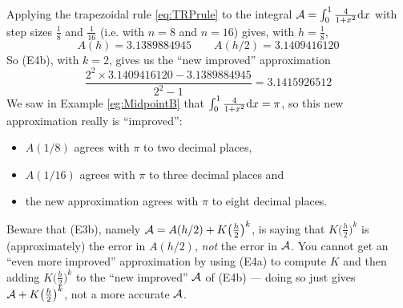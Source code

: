 \begin{eg}\label{eg:Richard}
Applying the trapezoidal rule \eqref{eq:TRPrule}
to the integral $\mathcal{A}=\int_0^1\frac{4}{1+x^2}\mathrm{d}x$
with step sizes $\frac{1}{8}$ and $\frac{1}{16}$
(i.e. with $n=8$ and $n=16$) gives, with $h=\frac{1}{8}$,
\begin{equation*}
A(h)=3.1389884945\qquad
A(h/2)=3.1409416120
\end{equation*}
So (E4b), with $k=2$, gives us
the ``new improved'' approximation
\begin{equation*}
\frac{2^2\times 3.1409416120 -3.1389884945}{2^2-1}=3.1415926512
\end{equation*}
We saw in Example \ref{eg:MidpointB} that $\int_0^1\frac{4}{1+x^2}\mathrm{d}x=\pi$,
so this new approximation really is ``improved'':
\begin{itemize}\itemsep1pt \parskip0pt  %
\item $A(1/8)$ agrees with $\pi$ to two decimal places,
\item $A(1/16)$  agrees with $\pi$ to three decimal places
            and
\item the new approximation  agrees with $\pi$ to eight decimal places.
\end{itemize}
Beware that (E3b), namely $\mathcal{A}=A(h/2)+K\big(\tfrac{h}{2}\big)^k$, is saying that $K\big(\frac{h}{2}\big)^k$ is (approximately)
the error in $A(h/2)$, \emph{not} the error in $\mathcal{A}$. 
You cannot get an ``even more improved'' approximation by using (E4a) to 
compute $K$ and then adding $K\big(\frac{h}{2}\big)^k$ to the 
``new improved'' $\mathcal{A}$ of (E4b) --- doing so just gives $\mathcal{A}+K\big(\frac{h}{2}\big)^k$, not a more accurate $\mathcal{A}$. 
\end{eg}

